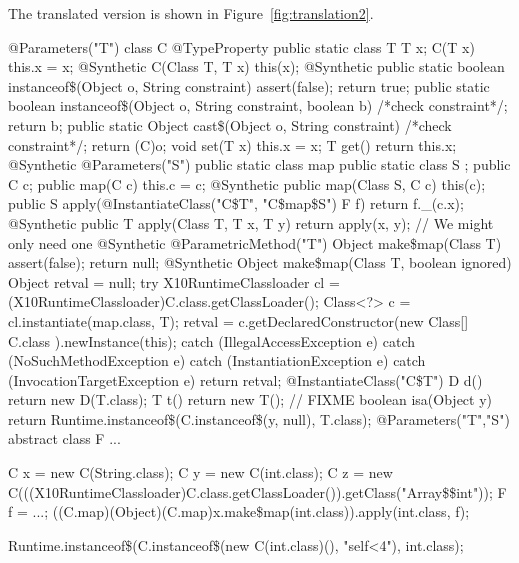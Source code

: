 {The translated version is shown in Figure~\ref{fig:translation2}.
\begin{figure*}[tp]
{\footnotesize
\begin{xten}
@Parameters({"T"})
class C {
    @TypeProperty public static class T { }
    T x;
    C(T x) { this.x = x; }
    @Synthetic C(Class T, T x) { this(x); }
    @Synthetic public static boolean instanceof\$(Object o, String constraint) { assert(false); return true; }
    public static boolean instanceof\$(Object o, String constraint, boolean b) { /*check constraint*/; return b; }
    public static Object cast\$(Object o, String constraint) { /*check constraint*/; return (C)o; }
    void set(T x) { this.x = x; }
    T get() { return this.x; }
    @Synthetic
    @Parameters("S")
    public static class map {
        public static class S { };
        public C c;
        public map(C c) { this.c = c; }
        @Synthetic
        public map(Class S, C c) { this(c); }
        public S apply(@InstantiateClass({"C\$T", "C\$map\$S"}) F f) { return f._(c.x); }
        @Synthetic
        public T apply(Class T, T x, T y) { return apply(x, y); } // We might only need one
    }
    @Synthetic
    @ParametricMethod("T")
    Object make\$map(Class T) { assert(false); return null; }
    @Synthetic
    Object make\$map(Class T, boolean ignored) {
        Object retval = null;
        try {
            X10RuntimeClassloader cl = (X10RuntimeClassloader)C.class.getClassLoader();
            Class<?> c = cl.instantiate(map.class, T); 
            retval = c.getDeclaredConstructor(new Class[] { C.class }).newInstance(this);
        }
        catch (IllegalAccessException e) { }
        catch (NoSuchMethodException e) { }
        catch (InstantiationException e) { }
        catch (InvocationTargetException e) { }
        return retval;
    }
    @InstantiateClass({"C\$T"}) D d() { return new D(T.class); }
    T t() { return new T(); } // FIXME
    boolean isa(Object y) { return Runtime.instanceof\$(C.instanceof\$(y, null), T.class); }
}
@Parameters({"T","S"})
abstract class F { ... }

C x = new C(String.class);
C y = new C(int.class);
C z = new C(((X10RuntimeClassloader)C.class.getClassLoader()).getClass("Array\$\$int"));
F f = ...;
((C.map)(Object)(C.map)x.make\$map(int.class)).apply(int.class, f);

Runtime.instanceof\$(C.instanceof\$(new C(int.class)(), "self<4"), int.class);
\end{xten}}
\caption{Translated code}
\label{fig:translation2}
\end{figure*}
}

